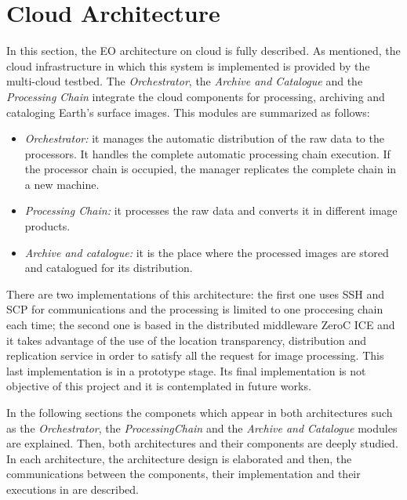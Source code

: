 \section{Cloud Architecture}

In this section, the \ac{EO} architecture on cloud is fully described. As
mentioned, the cloud infrastructure in which this system is implemented is provided
by the \bonfire multi-cloud testbed. The \emph{Orchestrator}, the \emph{Archive and
  Catalogue} and the \emph{Processing
Chain} integrate the cloud components for processing, archiving and cataloging
Earth's surface images. This modules are summarized as follows:
\begin{itemize}
\item \emph{Orchestrator:} it manages the automatic distribution of the raw data to the processors. It handles the complete automatic processing chain execution.  If the processor chain is occupied, the manager replicates the complete chain in a new machine.
\item \emph{Processing Chain:} it processes the raw data and converts it in
  different image products. 
\item \emph{Archive and catalogue:} it is the place where the processed images are stored and catalogued for its distribution.
\end{itemize}


There are two implementations of this architecture: the first one uses \ac{SSH}
and \ac{SCP} for communications and the processing is limited to one proccesing chain each time; the second one is based in the distributed middleware
ZeroC ICE and it takes advantage of the use of the location transparency,
distribution and replication service in order to satisfy all the request for
image processing. This last implementation is in a prototype stage. Its final
implementation is not objective of this project and it is contemplated in future
works.


In the following sections the
componets which appear in both architectures such as the \emph{Orchestrator},
the \emph{ProcessingChain} and the \emph{Archive and Catalogue} modules are explained. Then, both
architectures and their components are deeply studied. In each architecture, the architecture design is elaborated and then, the communications
between the components, their implementation and their executions in \bonfire are described.





